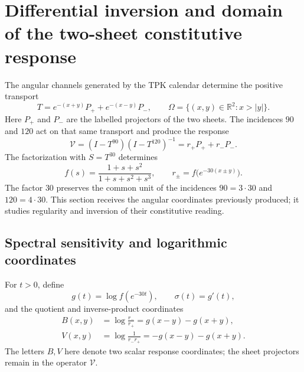 
\section[Differential inversion of the constitutive response]{Differential inversion and domain of the two-sheet constitutive response}
\label{jc:sec:constitutiva}

The angular channels generated by the TPK calendar determine the positive transport
\[
T=e^{-(x+y)}P_++e^{-(x-y)}P_-,\qquad
\Omega=\{(x,y)\in\mathbb R^2:x>|y|\}.
\]
Here $P_+$ and $P_-$ are the labelled projectors of the two sheets. The incidences $90$ and $120$ act on that same transport and produce the response
\[
\mathcal V=(I-T^{90})(I-T^{120})^{-1}=r_+P_++r_-P_-.
\]
The factorization with $S=T^{30}$ determines
\begin{equation}
f(s)=\frac{1+s+s^2}{1+s+s^2+s^3},\qquad
r_\pm=f\bigl(e^{-30(x\pm y)}\bigr).
\label{jc:eq:respuesta}
\end{equation}
The factor $30$ preserves the common unit of the incidences $90=3\cdot30$ and $120=4\cdot30$. This section receives the angular coordinates previously produced; it studies regularity and inversion of their constitutive reading.

\subsection{Spectral sensitivity and logarithmic coordinates}

For $t>0$, define
\[
g(t)=\log f(e^{-30t}),\qquad \sigma(t)=g'(t),
\]
and the quotient and inverse-product coordinates
\begin{align}
B(x,y)&=\log\frac{r_-}{r_+}=g(x-y)-g(x+y),\\
V(x,y)&=\log\frac1{r_-r_+}=-g(x-y)-g(x+y).
\label{jc:eq:bv}
\end{align}
The letters $B,V$ here denote two scalar response coordinates; the sheet projectors remain in the operator $\mathcal V$.

